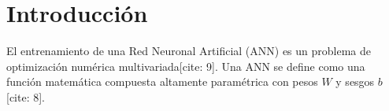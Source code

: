 \section{Introducción}
El entrenamiento de una Red Neuronal Artificial (ANN) es un problema de optimización numérica multivariada[cite: 9]. Una ANN se define como una función matemática compuesta altamente paramétrica con pesos $W$ y sesgos $b$[cite: 8].
